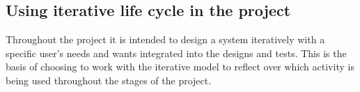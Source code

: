 \subsection{Using iterative life cycle in the project}
Throughout the project it is intended to design a system iteratively with a specific user’s needs and wants integrated into the designs and tests. This is the basis of choosing to work with the iterative model to reflect over which activity is being used throughout the stages of the project.